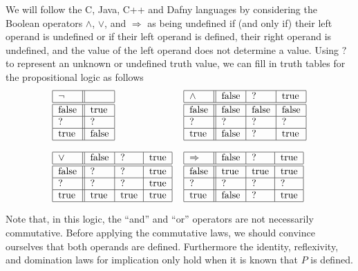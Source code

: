 \documentclass[11pt]{article}%
\begin{document}
We will follow the C, Java, C++ and Dafny languages by considering the Boolean operators $\wedge$, $\vee$, and $\Rightarrow$ as being undefined if (and only if) their left operand is undefined or if their left operand is defined, their right operand is undefined, and the value of the left operand does not determine a value.  Using $?$ to represent an unknown or
undefined truth value, we can fill in truth tables for the propositional logic
as follows%
\[
\begin{tabular}[c]{ll}
	\begin{tabular}[c]{|l||l|}\hline
	$\lnot$ & \\\hline\hline
	false & true\\\hline
	? & ?\\\hline
	true & false\\\hline
	\end{tabular}
&
	\begin{tabular}[c]{|l||l|l|l|}\hline
	$\wedge$ & false & ?     & true\\\hline\hline
	false    & false & false & false\\\hline
	?        & ?     & ?     & ?\\\hline
	true     & false & ?     & true\\\hline
	\end{tabular}
\\
\\
	\begin{tabular}[c]{|l||l|l|l|}\hline
	$\vee$ & false & ?    & true\\\hline\hline
	false  & ?     & ?    & true\\\hline
	? & ?  & ?     & true\\\hline
	true   & true  & true & true\\\hline
	\end{tabular}
&
	\begin{tabular}[c]{|l||l|l|l|}\hline
	$\Rightarrow$ & false & ?    & true\\\hline\hline
	false         & true  & true & true\\\hline
	?             & ?     & ?    & ?\\\hline
	true          & false & ?    & true\\\hline
	\end{tabular}
\end{tabular}
\]

Note that, in this logic, the ``and'' and ``or'' operators are not necessarily commutative.  Before applying the commutative laws, we should convince ourselves that both operands are defined. Furthermore the identity, reflexivity, and domination laws for implication only hold when it is known that $P$ is defined.
\end{document}
